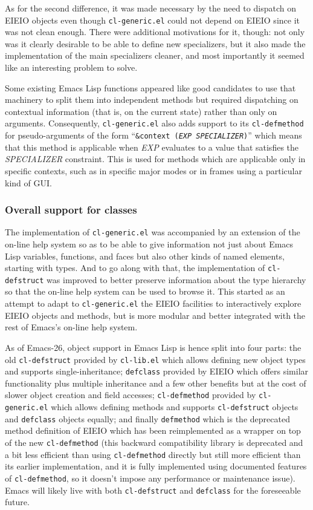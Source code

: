 \documentclass[format=acmsmall, review]{acmart}
\newcommand \Elisp {Emacs Lisp}
\newcommand \id[1] {\textrm{\textsl{#1}}}
\begin{document}
As for the second difference, it was made necessary by the need to dispatch
on EIEIO objects even though \texttt{cl-generic.el} could not depend on
EIEIO since it was not clean enough.  There were additional motivations for
it, though: not only was it clearly desirable to be able to define new
specializers, but it also made the implementation of the main specializers
cleaner, and most importantly it seemed like an interesting problem
to solve.

Some existing \Elisp{} functions appeared like good candidates to use that
machinery to split them into independent methods but required dispatching
on contextual information (that is, on the current state) rather than only on
arguments.  Consequently, \texttt{cl-generic.el} also adds support to its
\texttt{cl-defmethod} for pseudo-arguments of the form ``\texttt{\&context
  (\id{EXP} \id{SPECIALIZER})}'' which means that this method is
applicable when \id{EXP} evaluates to a value that satisfies the
\id{SPECIALIZER} constraint.  This is used for methods which
are applicable only in specific contexts, such as in specific major modes or
in frames using a particular kind of GUI.

\subsubsection{Overall support for classes}

The implementation of \texttt{cl-generic.el} was accompanied by an extension
of the on-line help system so as to be able to give information not just
about \Elisp{} variables, functions, and faces but also other kinds of named
elements, starting with types.  And to go along with that, the implementation
of \texttt{cl-defstruct} was improved to better preserve information about
the type hierarchy so that the on-line help system can be used to browse
it.  This started as an attempt to adapt to \texttt{cl-generic.el} the EIEIO
facilities to interactively explore EIEIO objects and methods, but is more
modular and better integrated with the rest of Emacs's on-line help system.

As of Emacs-26, object support in \Elisp{} is hence split into four parts: the
old \texttt{cl-defstruct} provided by \texttt{cl-lib.el} which allows
defining new object types and supports single-inheritance; \texttt{defclass}
provided by EIEIO which offers similar functionality plus multiple
inheritance and a few other benefits but at the cost of slower object
creation and field accesses; \texttt{cl-defmethod} provided by
\texttt{cl-generic.el} which allows defining methods and supports
\texttt{cl-defstruct} objects and \texttt{defclass} objects equally; and finally
\texttt{defmethod} which is the deprecated method definition of EIEIO which
has been reimplemented as a wrapper on top of the new \texttt{cl-defmethod}
(this backward compatibility library is deprecated and a bit less efficient
than using \texttt{cl-defmethod} directly but still more efficient than its
earlier implementation, and it is fully implemented using documented features
of \texttt{cl-defmethod}, so it doesn't impose any performance or
maintenance issue).  Emacs will likely live with both \texttt{cl-defstruct} and
\texttt{defclass} for the foreseeable future.
\end{document}
